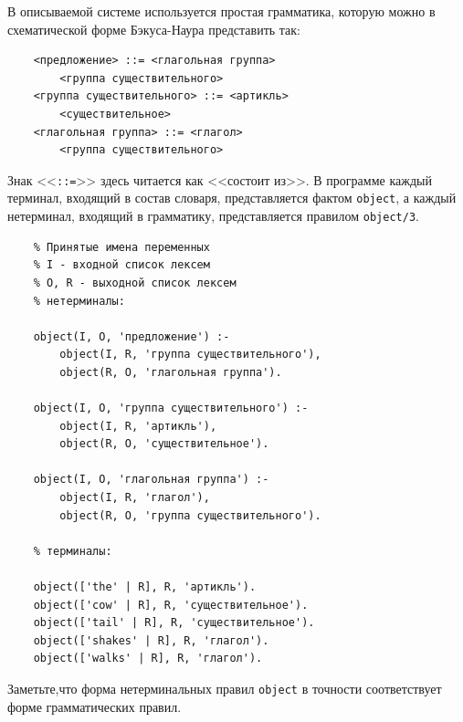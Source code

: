 \documentclass[12pt, openany, twoside]{book} %
\begin{document}
В описываемой системе используется простая грамматика, которую можно в схематической форме Бэкуса-Наура представить так:
{\tt\begin{verbatim}
    <предложение> ::= <глагольная группа>
        <группа существительного>
    <группа существительного> ::= <артикль>
        <существительное>
    <глагольная группа> ::= <глагол>
        <группа существительного>
\end{verbatim}}

Знак <<{\tt ::=}>> здесь читается как <<состоит из>>. В программе каждый терминал, входящий в состав словаря, представляется фактом {\tt object}, а каждый нетерминал, входящий в грамматику, представляется правилом {\tt object/3}.
{\tt\begin{verbatim}
    % Принятые имена переменных
    % I - входной список лексем
    % О, R - выходной список лексем
    % нетерминалы:

    object(I, О, 'предложение') :-
        object(I, R, 'группа существительного'),
        object(R, О, 'глагольная группа').

    object(I, О, 'группа существительного') :-
        object(I, R, 'артикль'),
        object(R, О, 'существительное').

    object(I, О, 'глагольная группа') :-
        object(I, R, 'глагол'),
        object(R, О, 'группа существительного').

    % терминалы:

    object(['the' | R], R, 'артикль').
    object(['cow' | R], R, 'существительное').
    object(['tail' | R], R, 'существительное').
    object(['shakes' | R], R, 'глагол').
    object(['walks' | R], R, 'глагол').
\end{verbatim}}

\noindent Заметьте,что форма нетерминальных правил {\tt object} в точности соответствует форме грамматических правил.
\end{document}
